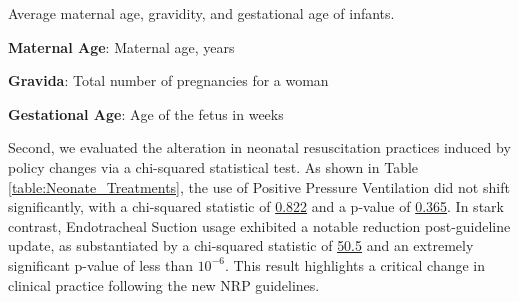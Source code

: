 \documentclass[11pt]{article}
\begin{document}
\begin{table}[h]
\caption{\protect\hyperlink{file-table-0-pkl}{Summary of Maternal Age, Gravida, and Gestational Age.}}
\label{table:Summary_Stats}
\begin{threeparttable}
\renewcommand{\TPTminimum}{\linewidth}
\begin{tablenotes}
\footnotesize
\item Average maternal age, gravidity, and gestational age of infants.
\item \textbf{Maternal Age}: Maternal age, years
\item \textbf{Gravida}: Total number of pregnancies for a woman
\item \textbf{Gestational Age}: Age of the fetus in weeks
\end{tablenotes}
\end{threeparttable}
\end{table}


Second, we evaluated the alteration in neonatal resuscitation practices induced by policy changes via a chi-squared statistical test. As shown in Table \ref{table:Neonate_Treatments}, the use of Positive Pressure Ventilation did not shift significantly, with a chi-squared statistic of \hyperlink{B0a}{0.822} and a p-value of \hyperlink{B0b}{0.365}. In stark contrast, Endotracheal Suction usage exhibited a notable reduction post-guideline update, as substantiated by a chi-squared statistic of \hyperlink{B1a}{50.5} and an extremely significant p-value of less than \hyperlink{B1b}{$10^{-6}$}. This result highlights a critical change in clinical practice following the new NRP guidelines.
\end{document}
